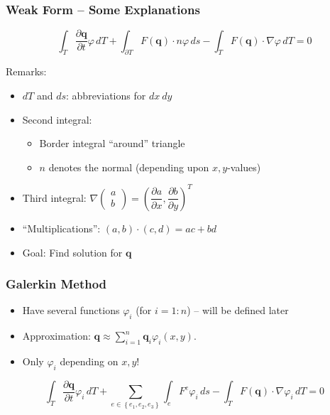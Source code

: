\documentclass{beamer}
\newcommand{\pd}[2]{\dfrac{\partial #1}{\partial #2}}
\renewcommand{\phi}{\varphi}
\begin{document}
\begin{frame}
  \frametitle{Weak Form -- Some Explanations}
  \begin{equation}
    \label{eq:shallow-water-weak-form-div-applied}
    \int_T \pd {\mathbf{q}}{t} \phi \, dT +
    \int_{\partial T} F(\mathbf{q}) \cdot n \phi \, ds -
    \int_T F(\mathbf{q}) \cdot \nabla \phi \, dT = 0
  \end{equation}
  
  \begin{block}{Remarks:}
    \begin{itemize}
    \item $dT$ and $ds$: abbreviations for $dx\ dy$
    \item Second integral:
      \begin{itemize}
      \item Border integral ``around'' triangle
      \item $n$ denotes the normal (depending upon $x,y$-values)
      \end{itemize}
    \item Third integral: $\nabla
      \begin{pmatrix}
        a \\ b
      \end{pmatrix} =\left( \pd{a}{x}, \pd{b}{y} \right) ^T$
    \item ``Multiplications'': $(a,b)\cdot(c,d) = ac+bd$
    \item Goal: Find solution for $\mathbf{q}$
    \end{itemize}
  \end{block}
\end{frame}

\begin{frame}
  \frametitle{Galerkin Method}
  \begin{itemize}
  \item Have several functions $\phi_i$ (for $i=1:n$) -- will be defined later
  \item Approximation: 
    $\mathbf{q} \approx \sum_{i=1}^n \mathbf{q}_i \phi_i(x,y)$.
  \item Only $\phi_i$ depending on $x,y$!
  \end{itemize}

  \begin{equation}
    \label{eq:shallow-water-weak-form-div-applied-approximation}
    \int_T \pd {\mathbf{q}}{t} \phi_i \, dT +
    \sum_{e\in\left\{ e_1,e_2,e_3 \right\}} \int_{e} F^e \phi_i \, ds  -
    \int_T F(\mathbf{q}) \cdot \nabla \phi_i \, dT = 0
  \end{equation}
\end{frame}
\end{document}
